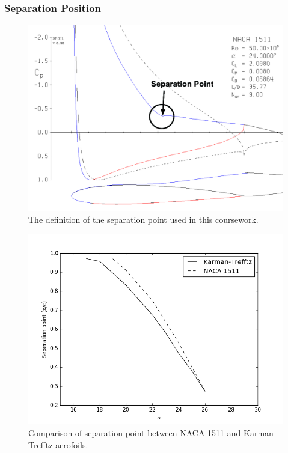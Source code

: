 \documentclass[10pt,a4paper]{article}
\begin{document}
\subsubsection{Separation Position}
\begin{figure}[!htb]
\centering
\includegraphics[scale=0.5]{Figures/separation_point.png}
\caption{The definition of the separation point used in this coursework.}
\label{fig:separation_point}
\end{figure}
\begin{figure}[!htb]
\centering
\includegraphics[scale=0.75]{Figures/separation_comparison.png}
\caption{Comparison of separation point between NACA 1511 and Karman-Trefftz aerofoils.}
\label{fig:separation_comparison}
\end{figure}
\end{document}
